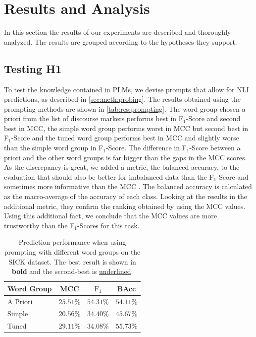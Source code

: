 \section{Results and Analysis} \label{sec:results}
In this section the results of our experiments are described and thoroughly analyzed. The results are grouped according to the hypotheses they support.

\subsection{Testing H1}
To test the knowledge contained in \acp{PLM}, we devise prompts that allow for \ac{NLI} predictions, as described in \autoref{sec:meth:probing}. The results obtained using the prompting methods are shown in \autoref{tab:res:prompting}. The word group chosen a priori from the list of discourse markers performs best in F$_1$-Score and second best in \ac{MCC}, the simple word group performs worst in \ac{MCC} but second best in F$_1$-Score and the tuned word group performs best in \ac{MCC} and slightly worse than the simple word group in F$_1$-Score. The difference in F$_1$-Score between a priori and the other word groups is far bigger than the gaps in the \ac{MCC} scores. As the discrepancy is great, we added a metric, the balanced accuracy, to the evaluation that should also be better for imbalanced data than the F$_1$-Score and sometimes more informative than the \ac{MCC} \cite{mccBad}. The balanced accuracy is calculated as the macro-average of the accuracy of each class. Looking at the results in the additional metric, they confirm the ranking obtained by using the \ac{MCC} values. Using this additional fact, we conclude that the \ac{MCC} values are more trustworthy than the F$_1$-Scores for this task.

\begin{table}[ht!]
    \centering
    \caption{Prediction performance when using prompting with different word groups on the \acs{SICK} dataset. The best result is shown in \textbf{bold} and the second-best is \underline{underlined}.}
    \begin{tabular}{l c c c}
        \toprule
        \multicolumn{1}{c}{Word Group} & \acs{MCC} & $\text{F}_1$ & BAcc\\
        \midrule
        A Priori & $\underline{25.51}\%$ & $\mathbf{54.31\%}$ & $\underline{54.11}\%$ \\
        Simple & $20.56\%$ & $\underline{34.40\%}$ & $45.67\%$ \\
        Tuned & $\mathbf{29.11\%}$ & $34.08\%$ & $\mathbf{55.73\%}$\\
        \bottomrule
    \end{tabular}
    \label{tab:res:prompting}
\end{table}

